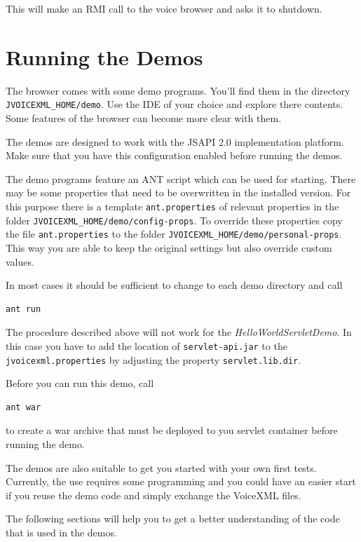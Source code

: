 \documentclass[11pt,a4paper]{book}
\begin{document}
This will make an RMI call to the voice browser and asks it to shutdown.

\section{Running the Demos}

The browser comes with some demo programs. You'll find them in the
directory \texttt{JVOICEXML\_HOME/demo}. Use the IDE of your choice
and explore there contents. Some features of the browser can 
become more clear with them.

The demos are designed to work with the JSAPI 2.0 implementation platform. Make
sure that you have this configuration enabled before running the demos.

The demo programs feature an ANT script which can be used for starting.
There may be some properties that need to be overwritten in the installed
version. For this purpose there is a template \lstinline{ant.properties} of
relevant properties in the folder \lstinline{JVOICEXML_HOME/demo/config-props}.
To override these properties copy the file \texttt{ant.properties} to the
folder \lstinline{JVOICEXML_HOME/demo/personal-props}. This way you are able
to keep the original settings but also override custom values.

In most cases it should be sufficient to change to each demo directory
and call

\begin{lstlisting}
ant run
\end{lstlisting}

The procedure described above will not work for the
\emph{HelloWorldServletDemo}. In this case you have to add the location of
\texttt{servlet-api.jar} to the \texttt{jvoicexml.properties} by adjusting the
property \texttt{servlet.lib.dir}.

Before you can run this demo, call

\begin{lstlisting}
ant war
\end{lstlisting}

to create a war archive that must be deployed to you servlet container
before running the demo.

The demos are also suitable to get you started with your own first tests.
Currently, the use requires some programming and you could have an easier
start if you reuse the demo code and simply exchange the VoiceXML files.

The following sections will help you to get a better understanding of the
code that is used in the demos.
\end{document}
